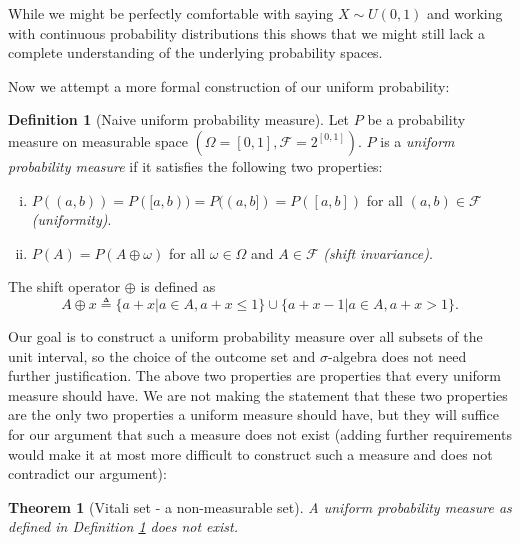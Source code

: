 \documentclass{book}
\theoremstyle{plain}%
\newtheorem{theorem}{Theorem}[section]
\theoremstyle{definition}
\newtheorem{definition}{Definition}[section]
\begin{document}
While we might be perfectly comfortable with saying $X \sim U(0,1)$ and working with continuous probability distributions  this shows that we might still lack a complete understanding of the underlying probability spaces.

Now we attempt a more formal construction of our uniform probability:

\begin{definition}[Naive uniform probability measure]
Let $P$ be a probability measure on measurable space $(\Omega = [0,1], \mathcal{F} = 2^{[0,1]})$. $P$ is a \emph{uniform probability measure} if it satisfies the following two properties:
  
\begin{enumerate}[(i)]
\item $P((a,b)) = P([a,b)) = P((a,b]) = P([a,b])$ for all $(a,b) \in \mathcal{F}$ \emph{(uniformity)}.
\item $P(A) = P(A \oplus \omega)$ for all $\omega \in \Omega$ and $A \in \mathcal{F}$ \emph{(shift invariance)}.
\end{enumerate}

The shift operator $\oplus$ is defined as $$A \oplus x \triangleq \{a + x|a \in A, a+ x \leq 1\} \cup \{a + x - 1|a \in A, a+ x > 1\}.$$\label{def:naive_uniform}
\end{definition}

Our goal is to construct a uniform probability measure over all subsets of the unit interval, so the choice of the outcome set and $\sigma$-algebra does not need further justification. The above two properties are properties that every uniform measure should have. We are not making the statement that these two properties are the only two properties a uniform measure should have, but they will suffice for our argument that such a measure does not exist (adding further requirements would make it at most more difficult to construct such a measure and does not contradict our argument):

\begin{theorem}[Vitali set - a non-measurable set]
A uniform probability measure as defined in Definition \ref{def:naive_uniform} does not exist.\label{thm:nonexistence}
\end{theorem}
\end{document}
